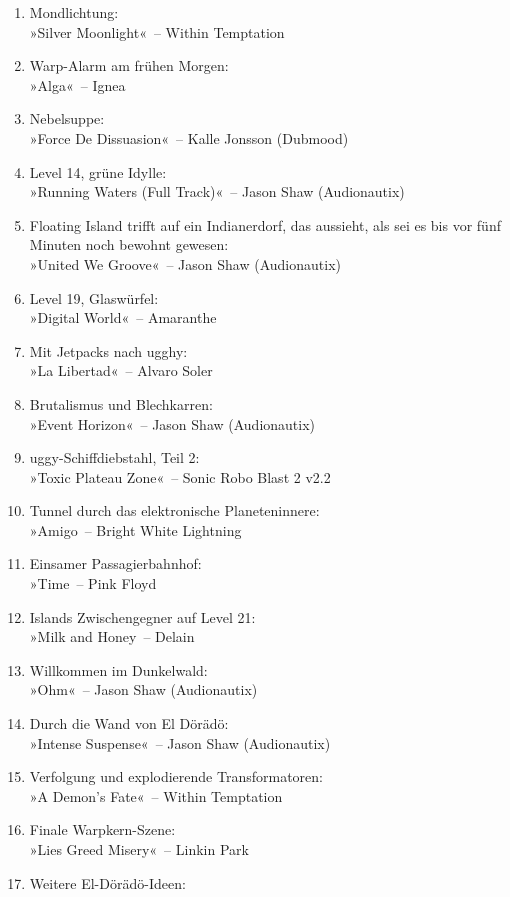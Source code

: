 \begin{enumerate}
    \item Mondlichtung:\\ »Silver Moonlight«~– Within Temptation
    \item Warp-Alarm am frühen Morgen:\\ »Alga«~– Ignea
    \item Nebelsuppe:\\ »Force De Dissuasion«~– Kalle Jonsson (Dubmood)
    \item Level 14, grüne Idylle:\\ »Running Waters (Full Track)«~– Jason Shaw (Audionautix)
    \item Floating Island trifft auf ein Indianerdorf, das aussieht, als sei es bis vor fünf Minuten noch bewohnt gewesen:\\ »United We Groove«~– Jason Shaw (Audionautix)
    \item Level 19, Glaswürfel:\\ »Digital World«~– Amaranthe
    \item Mit Jetpacks nach ugghy:\\ »La Libertad«~– Alvaro Soler
    \item Brutalismus und Blechkarren:\\ »Event Horizon«~– Jason Shaw (Audionautix)
    \item uggy-Schiffdiebstahl, Teil 2:\\ »Toxic Plateau Zone«~– Sonic Robo Blast 2 v2.2
    \item Tunnel durch das elektronische Planeteninnere:\\ »Amigo~– Bright White Lightning
    \item Einsamer Passagierbahnhof:\\ »Time~– Pink Floyd
    \item Islands Zwischengegner auf Level 21:\\ »Milk and Honey~– Delain
    \item Willkommen im Dunkelwald:\\ »Ohm«~– Jason Shaw (Audionautix)
    \item Durch die Wand von El Dörädö:\\ »Intense Suspense«~– Jason Shaw (Audionautix)
    \item Verfolgung und explodierende Transformatoren:\\ »A Demon's Fate«~– Within Temptation
    \item Finale Warpkern-Szene:\\ »Lies Greed Misery«~– Linkin Park
    \item Weitere El-Dörädö-Ideen:

\end{enumerate}
